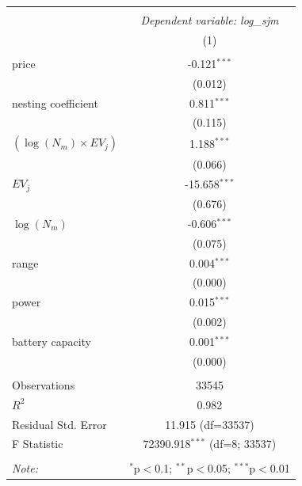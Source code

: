\begin{table}[!htbp] \centering
\begin{tabular}{@{\extracolsep{5pt}}lc}
\\[-1.8ex]\hline
\hline \\[-1.8ex]
& \multicolumn{1}{c}{\textit{Dependent variable: log_sjm}} \
\cr \cline{2-2}
\\[-1.8ex] & (1) \\
\hline \\[-1.8ex]
 price & -0.121$^{***}$ \\
& (0.012) \\
 nesting coefficient & 0.811$^{***}$ \\
& (0.115) \\
 $(\log(N_m) \times EV_j)$ & 1.188$^{***}$ \\
& (0.066) \\
 $EV_j$ & -15.658$^{***}$ \\
& (0.676) \\
 $\log(N_m)$ & -0.606$^{***}$ \\
& (0.075) \\
 range & 0.004$^{***}$ \\
& (0.000) \\
 power & 0.015$^{***}$ \\
& (0.002) \\
 battery capacity & 0.001$^{***}$ \\
& (0.000) \\
\hline \\[-1.8ex]
 Observations & 33545 \\
 $R^2$ & 0.982 \\
 Residual Std. Error & 11.915 (df=33537) \\
 F Statistic & 72390.918$^{***}$ (df=8; 33537) \\
\hline
\hline \\[-1.8ex]
\textit{Note:} & \multicolumn{1}{r}{$^{*}$p$<$0.1; $^{**}$p$<$0.05; $^{***}$p$<$0.01} \\
\end{tabular}
\end{table}